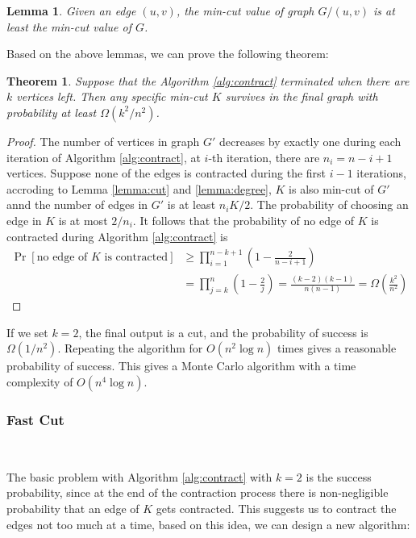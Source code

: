 \documentclass[11pt]{article}
\theoremstyle{plain}
\newtheorem{lemma}{Lemma}[section]
\newtheorem{theorem}{Theorem}[section]
\begin{document}
\begin{lemma}
    \label{lemma:contract}
    Given an edge $(u,v)$, the min-cut value of graph $G/(u,v)$ is at least the min-cut value of $G$.
\end{lemma}

Based on the above lemmas, we can prove the following theorem:

\begin{theorem}
    \label{theorem:contract}
    Suppose that the Algorithm \ref{alg:contract} terminated when there are $k$ vertices left. Then any specific min-cut $K$ survives in the final graph with probability at least $\Omega(k^2/n^2)$.
\end{theorem}
\begin{proof}
    The number of vertices in graph $G'$ decreases by exactly one during each iteration of Algorithm \ref{alg:contract}, at $i$-th iteration, there are $n_i=n-i+1$ vertices. Suppose none of the edges is contracted during the first $i-1$ iterations, accroding to Lemma \ref{lemma:cut} and \ref{lemma:degree}, $K$ is also min-cut of $G'$ annd the number of edges in $G'$ is at least $n_iK/2$. The probability of choosing an edge in $K$ is at most $2/n_i$. It follows that the probability of no edge of $K$ is contracted during Algorithm \ref{alg:contract} is
\begin{align*}
    \Pr[\text{no edge of }K\text{ is contracted}]&\ge\prod_{i=1}^{n-k+1}\left(1-\frac{2}{n-i+1}\right)\\
    &=\prod_{j=k}^n\left(1-\frac{2}{j}\right)=\frac{(k-2)(k-1)}{n(n-1)}=\Omega\left(\frac{k^2}{n^2}\right)
\end{align*}
\end{proof}


If we set $k=2$, the final output is a cut, and the probability of success is $\Omega(1/n^2)$. Repeating the algorithm for $O(n^2\log n)$ times gives a reasonable probability of success. This gives a Monte Carlo algorithm with a time complexity of $O(n^4\log n)$.

\subsubsection{Fast Cut}\

The basic problem with Algorithm \ref{alg:contract} with $k=2$ is the success probability, since at the end of the contraction process there is non-negligible probability that an edge of $K$ gets contracted. This suggests us to contract the edges not too much at a time, based on this idea, we can design a new algorithm:
\end{document}
